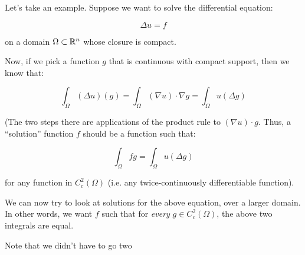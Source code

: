 \documentclass[a4paper]{amsart}
\begin{document}
Let's take an example. Suppose we want to solve the differential equation:

$$\Delta u = f$$

on a domain $\Omega \subset \mathbb{R}^n$ whose closure is compact.

Now, if we pick a function $g$ that is continuous with compact
support, then we know that:

$$\int_\Omega (\Delta u)(g) = \int_\Omega (\nabla u)\cdot \nabla g = \int_\Omega u (\Delta g)$$

(The two steps there are applications of the product rule to $(\nabla
u) \cdot g$. Thus, a ``solution'' function $f$ should be a function
such that:

$$\int_\Omega fg = \int_\Omega u (\Delta g)$$

for any function in $C^2_c(\Omega)$ (i.e. any twice-continuously
differentiable function). 

We can now try to look at solutions for the above equation, over a
larger domain. In other words, we want $f$ such that for {\em every}
$g \in C^2_c(\Omega)$, the above two integrals are equal.

Note that we didn't have to go two 
\end{document}
